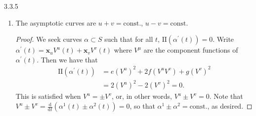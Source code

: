 \documentclass[11pt]{article}
\begin{document}
\begin{problem}{3.3.5}
\begin{enumerate}[label=(\alph*)]
\begin{proof}
          Hence, the lines of curvature are the coordinate curves.
        \end{proof}
  \item The asymptotic curves are \( u + v = \text{const.} \), \( u - v = \text{const.} \)
        \begin{proof}
          We seek curves \(\alpha \subset S\) such that for all \( t \), \( \mathrm{I\!I}(\alpha^{\prime}(t)) = 0 \).
          Write \( \alpha^{\prime}(t) = \mathbf{x}_u V^u(t) + \mathbf{x}_v V^v(t) \) where \( V^{\mu} \) are the component functions of \( \alpha^{\prime}(t) \).
          Then we have that
          \begin{equation}
          \label{eq:28}
          \begin{aligned}
            \mathrm{I\!I}(\alpha^{\prime}(t)) &= e (V^u)^2 + 2f(V^uV^v) + g(V^v)^2 \\
            &= 2 (V^{u})^2 - 2(V^v)^2 = 0.
          \end{aligned}
        \end{equation}
        This is satisfied when \( V^{u} = \pm V^v \), or, in other words, \( V^u \pm V^v = 0 \).
        Note that \( V^u \pm V^v = \frac{\mathrm{d} }{\mathrm{d} t}(\alpha^1(t) \pm \alpha^2(t)) = 0\), so that \( \alpha^1 \pm \alpha^2 = \text{const.} \), as desired.
        \end{proof}
\end{enumerate}
\end{problem}
\end{document}
